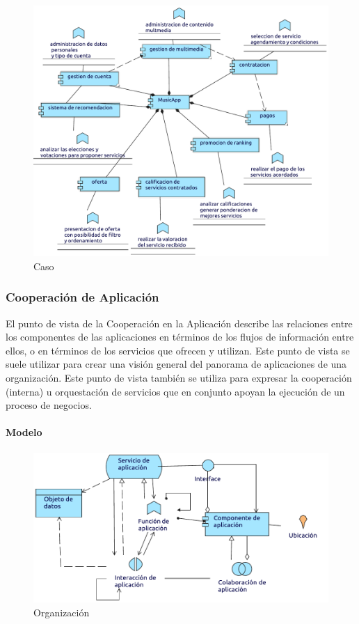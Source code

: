 \begin{figure}[h!]
	\centering
	\includegraphics[width=\linewidth]{Desarrollo/ArquitecturaEmpresarial/Aplicacion/imgs/Comportamiento.pdf}
	\caption{Caso}
\end{figure}

\newpage

\subsubsection{Cooperación de Aplicación}
El punto de vista de la Cooperación en la Aplicación describe las relaciones entre los componentes de las aplicaciones en términos de los flujos de información entre ellos, o en términos de los servicios que ofrecen y utilizan. Este punto de vista se suele utilizar para crear una visión general del panorama de aplicaciones de una organización. Este punto de vista también se utiliza para expresar la cooperación (interna) u orquestación de servicios que en conjunto apoyan la ejecución de un proceso de negocios.
\paragraph{Modelo}
\begin{figure}[h!]
	\centering
	\includegraphics[width=\linewidth]{Desarrollo/ArquitecturaEmpresarial/Aplicacion/imgs/CooperacionMetamodelo.pdf}
	\caption{Organización}
\end{figure}
\newpage
